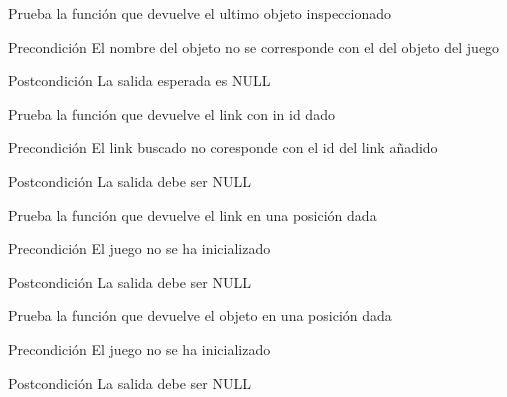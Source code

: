 \begin{DoxyRefList}
\item[\label{test__test000105}%
\hypertarget{test__test000105}{}%
Global \hyperlink{game__test_8c_a7675dddcc8631af9a8a288565b182b62}{test3\-\_\-game\-\_\-get\-\_\-last\-\_\-inspected\-\_\-object} ()]Prueba la función que devuelve el ultimo objeto inspeccionado \begin{DoxyPrecond}{Precondición}
El nombre del objeto no se corresponde con el del objeto del juego 
\end{DoxyPrecond}
\begin{DoxyPostcond}{Postcondición}
La salida esperada es N\-U\-L\-L  
\end{DoxyPostcond}

\item[\label{test__test000082}%
\hypertarget{test__test000082}{}%
Global \hyperlink{game__test_8c_a16d042e1fef87636cd0832adc1ef86db}{test3\-\_\-game\-\_\-get\-\_\-link} ()]Prueba la función que devuelve el link con in id dado \begin{DoxyPrecond}{Precondición}
El link buscado no coresponde con el id del link añadido 
\end{DoxyPrecond}
\begin{DoxyPostcond}{Postcondición}
La salida debe ser N\-U\-L\-L  
\end{DoxyPostcond}

\item[\label{test__test000085}%
\hypertarget{test__test000085}{}%
Global \hyperlink{game__test_8c_a69e8bc827c7bffd2627e65f86375df9d}{test3\-\_\-game\-\_\-get\-\_\-link\-\_\-at} ()]Prueba la función que devuelve el link en una posición dada \begin{DoxyPrecond}{Precondición}
El juego no se ha inicializado 
\end{DoxyPrecond}
\begin{DoxyPostcond}{Postcondición}
La salida debe ser N\-U\-L\-L  
\end{DoxyPostcond}

\item[\label{test__test000094}%
\hypertarget{test__test000094}{}%
Global \hyperlink{game__test_8c_a35817dfecf4895ae38ea241914b5c7c4}{test3\-\_\-game\-\_\-get\-\_\-object\-\_\-at} ()]Prueba la función que devuelve el objeto en una posición dada \begin{DoxyPrecond}{Precondición}
El juego no se ha inicializado 
\end{DoxyPrecond}
\begin{DoxyPostcond}{Postcondición}
La salida debe ser N\-U\-L\-L  
\end{DoxyPostcond}


\end{DoxyRefList}
